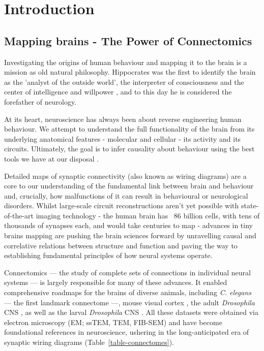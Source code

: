 
\chapter{Introduction}  

\section{Mapping brains - The Power of Connectomics} 

\label{Mapping Brains}
Investigating the origins of human behaviour and mapping it to the brain is a mission as old natural philosophy. Hippocrates was the first to identify the brain as the 'analyst of the outside world', the interpreter of consciousness and the center of intelligence and willpower \citep{breitenfeld2014hippocrates}, and to this day he is considered the forefather of neurology.

At its heart, neuroscience has always been about reverse engineering human behaviour. 
We attempt to understand the full functionality of the brain from its underlying anatomical features - molecular and cellular -  its activity and its circuits. Ultimately, the goal is to infer causality about behaviour using the best tools we have at our disposal \citep{mckinstry2013connectome}.

Detailed maps of synaptic connectivity (also known as wiring diagrams) are a core to our understanding of the fundamental link between brain and behaviour and, crucially, how malfunctions of it can result in behavioural or neurological disorders. Whilst large-scale circuit reconstructions aren't yet possible with state-of-the-art imaging technology - the human brain has ~86 billion cells\cite{herculano2009human}, with tens of thousands of synapses each, and would take centuries to map -  advances in tiny brains mapping are pushing the brain sciences forward by unravelling causal and correlative relations between structure and function and paving the way to establishing fundamental principles of how neural systems operate. 

Connectomics — the study of complete sets of connections in individual neural systems — is largely responsible for many of these advances. It enabled comprehensive roadmaps for the brains of diverse animals, including \textit{C. elegans} — the first landmark connectome \citep{brenner1974genetics} —, mouse visual cortex \citep{microns2025functional}, the adult \textit{Drosophila} CNS \citep{scheffer2020connectome}, as well as the larval \textit{Drosophila} CNS \citep{ohyama2015multilevel, berck2016wiring, larderet2017opticlobe, eichler2017complete, eschbach2021circuits, eschbach2020recurrent}. All these datasets were obtained via electron microscopy (EM; ssTEM, TEM, FIB-SEM) and have become foundational references in neuroscience, ushering in the long-anticipated era of synaptic wiring diagrams (Table~\ref{table-connectomes}).

